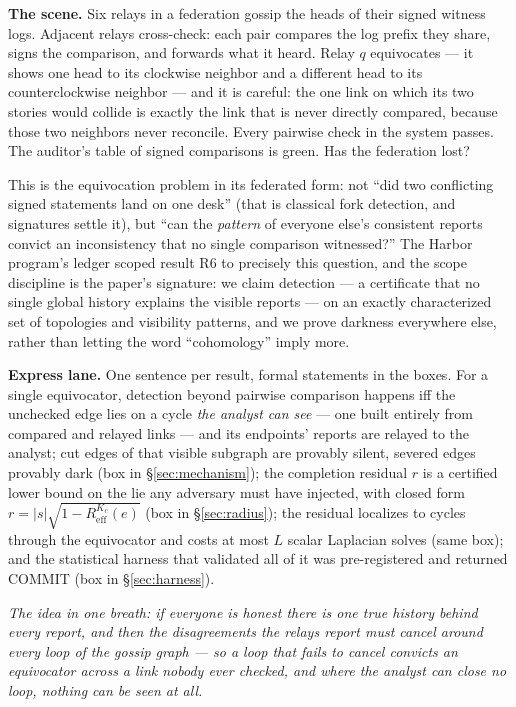 \documentclass[11pt,a4paper]{article}
\newcommand{\onebreath}[1]{\begin{center}\emph{#1}\end{center}}
\begin{document}
\textbf{The scene.} Six relays in a federation gossip the heads of their signed witness logs. Adjacent relays cross-check:
each pair compares the log prefix they share, signs the comparison, and forwards what it heard. Relay $q$ equivocates --- it
shows one head to its clockwise neighbor and a different head to its counterclockwise neighbor --- and it is careful: the one
link on which its two stories would collide is exactly the link that is never directly compared, because those two neighbors
never reconcile. Every pairwise check in the system passes. The auditor's table of signed comparisons is green. Has the
federation lost?

This is the equivocation problem in its federated form: not ``did two conflicting signed statements land on one desk''
(that is classical fork detection, and signatures settle it), but ``can the \emph{pattern} of everyone else's consistent
reports convict an inconsistency that no single comparison witnessed?'' The Harbor program's ledger scoped result R6 to
precisely this question, and the scope discipline is the paper's signature: we claim detection --- a certificate that no
single global history explains the visible reports --- on an exactly characterized set of topologies and visibility patterns,
and we prove darkness everywhere else, rather than letting the word ``cohomology'' imply more.

\textbf{Express lane.} One sentence per result, formal statements in the boxes. For a single equivocator, detection beyond
pairwise comparison happens iff the unchecked edge lies on a cycle \emph{the analyst can see} --- one built entirely from
compared and relayed links --- and its endpoints' reports are relayed to the analyst; cut edges of that visible subgraph are
provably silent, severed edges provably dark (box in \S\ref{sec:mechanism}); the completion residual $r$ is a certified lower bound on
the lie any adversary must have injected, with closed form $r=|s|\sqrt{1-R^{K_c}_{\mathrm{eff}}(e)}$ (box in \S\ref{sec:radius});
the residual localizes to cycles through the equivocator and costs at most $L$ scalar Laplacian solves (same box); and the
statistical harness that validated all of it was pre-registered and returned COMMIT (box in \S\ref{sec:harness}).

\onebreath{The idea in one breath: if everyone is honest there is one true history behind every report, and then the
disagreements the relays report must cancel around every loop of the gossip graph --- so a loop that fails to cancel convicts
an equivocator across a link nobody ever checked, and where the analyst can close no loop, nothing can be seen at all.}
\end{document}
